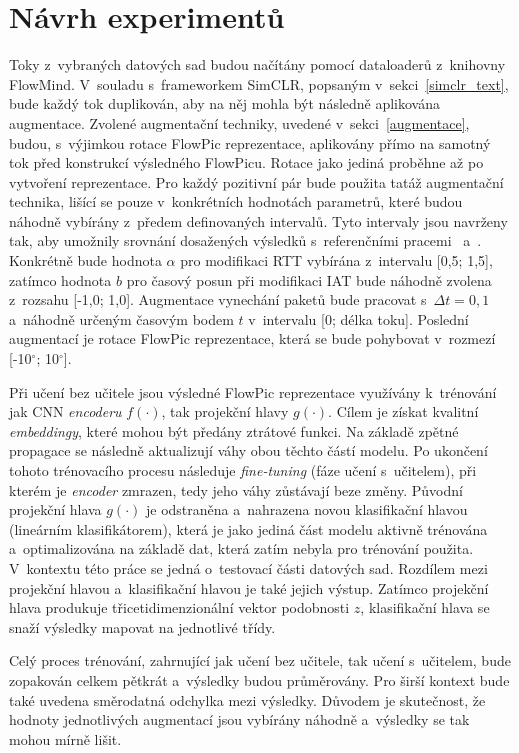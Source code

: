 \section{Návrh experimentů}
\label{training_proposal}
Toky z~vybraných datových sad budou načítány pomocí dataloaderů z~knihovny FlowMind. V~souladu s~frameworkem SimCLR, popsaným v~sekci~\ref{simclr_text}, bude každý tok duplikován, aby na něj mohla být následně aplikována augmentace. Zvolené augmentační techniky, uvedené v~sekci~\ref{augmentace}, budou, s~výjimkou rotace FlowPic reprezentace, aplikovány přímo na samotný tok před konstrukcí výsledného FlowPicu. Rotace jako jediná proběhne až po vytvoření reprezentace.
Pro každý pozitivní pár bude použita tatáž augmentační technika, lišící se pouze v~konkrétních hodnotách parametrů, které budou náhodně vybírány z~předem definovaných intervalů. Tyto intervaly jsou navrženy tak, aby umožnily srovnání dosažených výsledků s~referenčními pracemi~\cite{flowpic_augmentations} a~\cite{huawei_paper}. Konkrétně bude hodnota $\alpha$ pro modifikaci RTT vybírána z~intervalu [0,5; 1,5], zatímco hodnota $b$ pro časový posun při modifikaci IAT bude náhodně zvolena z~rozsahu [-1,0; 1,0]. Augmentace vynechání paketů bude pracovat s~$\Delta t = 0{,}1$ a~náhodně určeným časovým bodem $t$ v~intervalu [0; délka toku]. Poslední augmentací je rotace FlowPic reprezentace, která se bude pohybovat v~rozmezí [-10$^\circ$; 10$^\circ$].

Při učení bez učitele jsou výsledné FlowPic reprezentace využívány k~trénování jak CNN \textit{encoderu} $f(\cdot)$, tak projekční hlavy $g(\cdot)$. Cílem je získat kvalitní \textit{embeddingy}, které mohou být předány ztrátové funkci. Na základě zpětné propagace se následně aktualizují váhy obou těchto částí modelu. Po ukončení tohoto trénovacího procesu následuje \textit{fine-tuning} (fáze učení s~učitelem), při kterém je \textit{encoder} zmrazen, tedy jeho váhy zůstávají beze změny. Původní projekční hlava $g(\cdot)$ je odstraněna a~nahrazena novou klasifikační hlavou (lineárním klasifikátorem), která je jako jediná část modelu aktivně trénována a~optimalizována na základě dat, která zatím nebyla pro trénování použita. V~kontextu této práce se jedná o~testovací části datových sad. Rozdílem mezi projekční hlavou a~klasifikační hlavou je také jejich výstup. Zatímco projekční hlava produkuje třicetidimenzionální vektor podobnosti $z$, klasifikační hlava se snaží výsledky mapovat na jednotlivé třídy.

Celý proces trénování, zahrnující jak učení bez učitele, tak učení s~učitelem, bude zopakován celkem pětkrát a~výsledky budou průměrovány. Pro širší kontext bude také uvedena směrodatná odchylka mezi výsledky. Důvodem je skutečnost, že hodnoty jednotlivých augmentací jsou vybírány náhodně a~výsledky se tak mohou mírně lišit.

